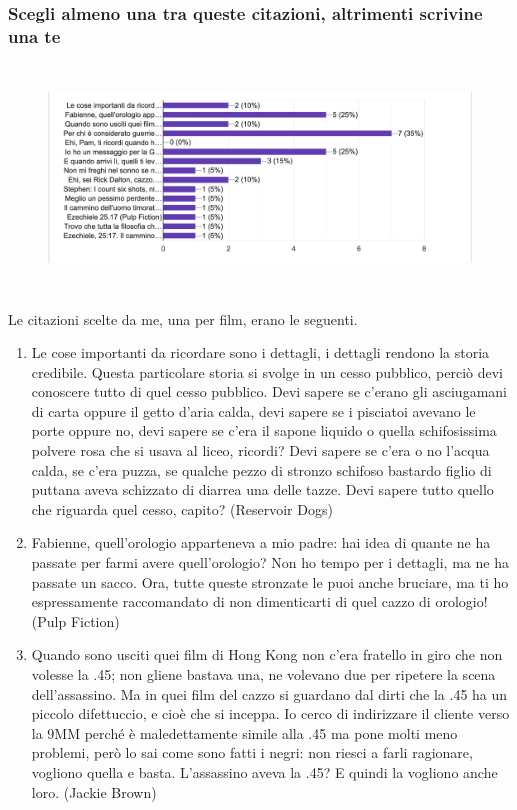 \documentclass[12pt]{article} %
\begin{document}
\subsubsection*{Scegli almeno una tra queste citazioni, altrimenti scrivine una te}
\begin{flushleft}
\begin{figure}[H]
    \includegraphics[width = 15cm, height = 6cm]{grafico3.png}
\end{figure}
Le citazioni scelte da me, una per film, erano le seguenti.
\begin{enumerate}
    \item Le cose importanti da ricordare sono i dettagli, i dettagli rendono la storia credibile. Questa particolare storia si svolge in un cesso pubblico, perciò devi conoscere tutto di quel cesso pubblico. Devi sapere se c'erano gli asciugamani di carta oppure il getto d'aria calda, devi sapere se i pisciatoi avevano le porte oppure no, devi sapere se c'era il sapone liquido o quella schifosissima polvere rosa che si usava al liceo, ricordi? Devi sapere se c'era o no l'acqua calda, se c'era puzza, se qualche pezzo di stronzo schifoso bastardo figlio di puttana aveva schizzato di diarrea una delle tazze. Devi sapere tutto quello che riguarda quel cesso, capito? (Reservoir Dogs)
    \item Fabienne, quell'orologio apparteneva a mio padre: hai idea di quante ne ha passate per farmi avere quell'orologio? Non ho tempo per i dettagli, ma ne ha passate un sacco. Ora, tutte queste stronzate le puoi anche bruciare, ma ti ho espressamente raccomandato di non dimenticarti di quel cazzo di orologio! (Pulp Fiction)
    \item Quando sono usciti quei film di Hong Kong non c'era fratello in giro che non volesse la .45; non gliene bastava una, ne volevano due per ripetere la scena dell'assassino. Ma in quei film del cazzo si guardano dal dirti che la .45 ha un piccolo difettuccio, e cioè che si inceppa. Io cerco di indirizzare il cliente verso la 9MM perché è maledettamente simile alla .45 ma pone molti meno problemi, però lo sai come sono fatti i negri: non riesci a farli ragionare, vogliono quella e basta. L'assassino aveva la .45? E quindi la vogliono anche loro. (Jackie Brown)

\end{enumerate}
\end{flushleft}
\end{document}
